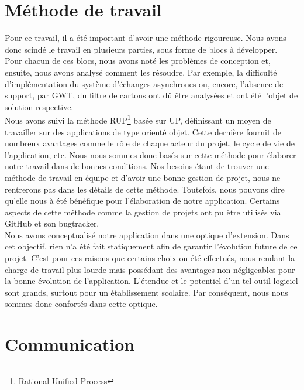   \section{Méthode de travail}
Pour ce travail, il a été important d'avoir une méthode rigoureuse. Nous avons donc scindé le travail en plusieurs parties, sous forme de blocs à développer.\\
\newline
\indent
Pour chacun de ces blocs, nous avons noté les problèmes de conception et, ensuite, nous avons analysé comment les résoudre. Par exemple,  la difficulté d'implémentation du système d'échanges asynchrones ou, encore, l'absence de support, par GWT, du filtre de cartons ont dû être analysées et ont été l'objet de solution respective. \\
\newline
\indent
Nous avons suivi la méthode RUP\footnote{Rational Unified Process} basée sur UP, définissant un moyen de travailler sur des applications de type orienté objet. Cette dernière fournit de nombreux avantages comme le rôle de chaque acteur du projet, le cycle de vie de l'application, etc. Nous nous sommes donc basés sur cette méthode pour élaborer notre travail dans de bonnes conditions.
\newline
\indent
Nos besoins étant de trouver une méthode de travail en équipe et d'avoir une bonne gestion de projet, nous ne rentrerons pas dans les détails de cette méthode. Toutefois, nous pouvons dire qu'elle nous à été bénéfique pour l'élaboration de notre application. Certains aspects de cette méthode comme la gestion de projets ont pu être utilisés via GitHub et son bugtracker. \\
\newline
\indent
Nous avons conceptualisé notre application dans une optique d'extension. Dans cet objectif, rien n'a été fait statiquement afin de garantir l'évolution future de ce projet. C'est pour ces raisons que certains choix on été effectués, nous rendant la charge de travail plus lourde mais possédant des avantages non négligeables pour la bonne évolution de l'application. L'étendue et le potentiel d'un tel outil-logiciel sont grands, surtout pour un établissement scolaire. Par conséquent, nous nous sommes donc confortés dans cette optique.

\section{Communication}

